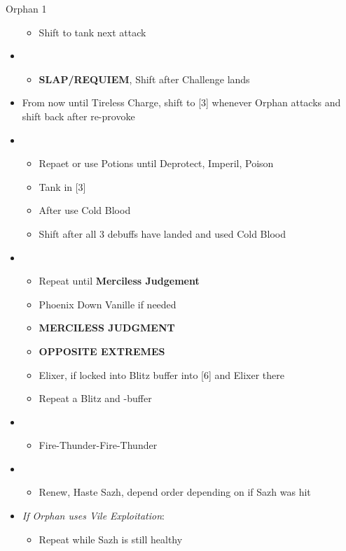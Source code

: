\documentclass{report}
\begin{document}
\begin{battle}{Orphan 1}
\begin{multicols}{2}
\begin{itemize}
\begin{itemize}
        \item Shift to tank next attack
    \end{itemize}
    \item \third
    \begin{itemize}
        \item \textbf{SLAP/REQUIEM}, Shift after Challenge lands
    \end{itemize}
    \vfill\null
    \columnbreak
    \item From now until Tireless Charge, shift to [3] whenever Orphan attacks and shift back after re-provoke
    \item \fifth
    \begin{itemize}
        \item Repaet or use Potions until Deprotect, Imperil, Poison
        \item Tank in [3]
        \item After \stagger use Cold Blood
        \item Shift after all 3 debuffs have landed and used Cold Blood
    \end{itemize}
    \item \first
    \begin{itemize}
        \item Repeat until \textbf{Merciless Judgement}
        \item Phoenix Down Vanille if needed
        \item \textbf{MERCILESS JUDGMENT}
        \item \textbf{OPPOSITE EXTREMES}
        \item Elixer, if locked into Blitz buffer into [6] and Elixer there
        \item Repeat a Blitz and \rav-buffer
    \end{itemize}
    \item \sixth
    \begin{itemize}
        \item Fire-Thunder-Fire-Thunder
    \end{itemize}
    \item \fourth
    \begin{itemize}
        \item Renew, Haste Sazh, depend order depending on if Sazh was hit
    \end{itemize}
    \item \textit{If Orphan uses Vile Exploitation}:
    \begin{itemize}
        \item Repeat while Sazh is still healthy

\end{itemize}
\end{itemize}
\end{multicols}
\end{battle}
\end{document}
